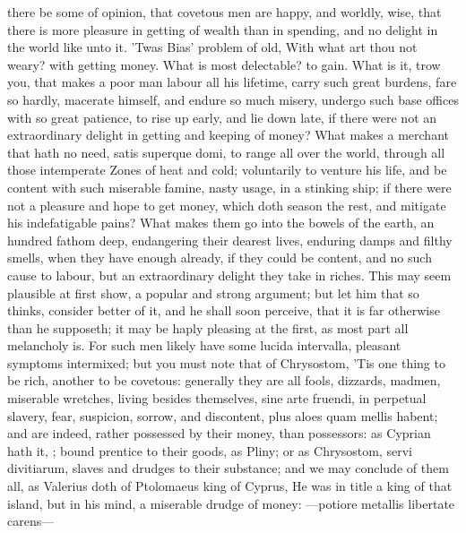 {there be some of opinion, that covetous men are happy, and worldly,
wise, that there is more pleasure in getting of wealth than in
spending, and no delight in the world like unto it. 'Twas Bias'
problem of old, With what art thou not weary? with getting money. What
is most delectable? to gain. What is it, trow you, that makes a poor
man labour all his lifetime, carry such great burdens, fare so hardly,
macerate himself, and endure so much misery, undergo such base offices
with so great patience, to rise up early, and lie down late, if there
were not an extraordinary delight in getting and keeping of money? What
makes a merchant that hath no need, satis superque domi, to range all
over the world, through all those intemperate Zones of heat and
cold; voluntarily to venture his life, and be content with such
miserable famine, nasty usage, in a stinking ship; if there were not a
pleasure and hope to get money, which doth season the rest, and
mitigate his indefatigable pains? What makes them go into the bowels of
the earth, an hundred fathom deep, endangering their dearest lives,
enduring damps and filthy smells, when they have enough already, if
they could be content, and no such cause to labour, but an
extraordinary delight they take in riches. This may seem plausible at
first show, a popular and strong argument; but let him that so thinks,
consider better of it, and he shall soon perceive, that it is far
otherwise than he supposeth; it may be haply pleasing at the first, as
most part all melancholy is. For such men likely have some lucida
intervalla, pleasant symptoms intermixed; but you must note that of
Chrysostom, 'Tis one thing to be rich, another to be covetous:
generally they are all fools, dizzards, madmen, miserable
wretches, living besides themselves, sine arte fruendi, in perpetual
slavery, fear, suspicion, sorrow, and discontent, plus aloes quam
mellis habent; and are indeed, rather possessed by their money, than
possessors: as Cyprian hath it, ; bound
prentice to their goods, as Pliny; or as Chrysostom, servi
divitiarum, slaves and drudges to their substance; and we may conclude
of them all, as Valerius doth of Ptolomaeus king of Cyprus, He
was in title a king of that island, but in his mind, a miserable drudge
of money:
---potiore metallis
libertate carens---

}
